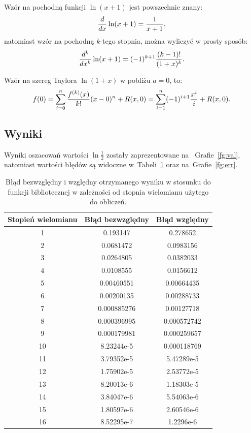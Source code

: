 \documentclass[11pt, wide, leqno]{mwart}
\begin{document}
Wzór na pochodną funkcji $\ln (x+1)$ jest powszechnie znany:
$${d\over dx}\ln (x+1)=\frac1{x+1},$$
natomiast wzór na pochodną $k$-tego stopnia, można wyliczyć w prosty sposób:
\begin{align}
    {d^k\over dx^k}\ln (x+1)=(-1)^{k+1}{(k-1)!\over(1+x)^{k}}.
\end{align}

Wzór na szereg Taylora $\ln (1+x)$ w pobliżu $a=0$, to:
$$f(0)=\sum\limits_{i=0}^n{f^{(k)}(x)\over k!}(x-0)^n + R(x, 0)=\sum\limits_{i=1}^n(-1)^{i+1}{x^i\over i}+R(x, 0).$$

\subsection*{Wyniki}

Wyniki oszacowań wartości $\ln\frac12$ zostały zaprezentowane na ~Grafie~\ref{fg:val}, natomiast wartości błędów są widoczne w~Tabeli~\ref{tab:ksks} oraz na~Grafie~\ref{fg:err}.

\begin{table}[h!]
    \centering
    \begin{tabular}{| c | c | c |}
        \hline
        Stopień wielomianu & Błąd bezwzględny & Błąd względny\\
        \hline
        1 & 0.193147 & 0.278652\\
        \hline
        2 & 0.0681472   &    0.0983156 \\
        \hline
        3 & 0.0264805   &    0.0382033 \\
        \hline
        4 & 0.0108555    &   0.0156612 \\
        \hline
        5 & 0.00460551   &   0.00664435 \\
        \hline
        6 & 0.00200135   &   0.00288733 \\
        \hline
        7 & 0.000885276  &   0.00127718 \\
        \hline
        8 & 0.000396995  &   0.000572742 \\
        \hline
        9 & 0.000179981 & 0.000259657 \\
        \hline
        10 & 8.23244e-5 & 0.000118769 \\
        \hline
        11 & 3.79352e-5   &   5.47289e-5 \\ 
        \hline
        12 & 1.75902e-5  &    2.53772e-5 \\
        \hline
        13 & 8.20013e-6   &   1.18303e-5 \\
        \hline
        14 & 3.84047e-6   &   5.54063e-6 \\
        \hline
        15 & 1.80597e-6   &   2.60546e-6 \\
        \hline
        16 & 8.52295e-7  &    1.2296e-6 \\
        \hline
    \end{tabular}
    \caption{Błąd bezwzględny i względny otrzymanego wyniku w stosunku do funkcji bibliotecznej w zależności od stopnia wielomianu użytego do obliczeń.\label{tab:ksks}}
\end{table}
\end{document}
